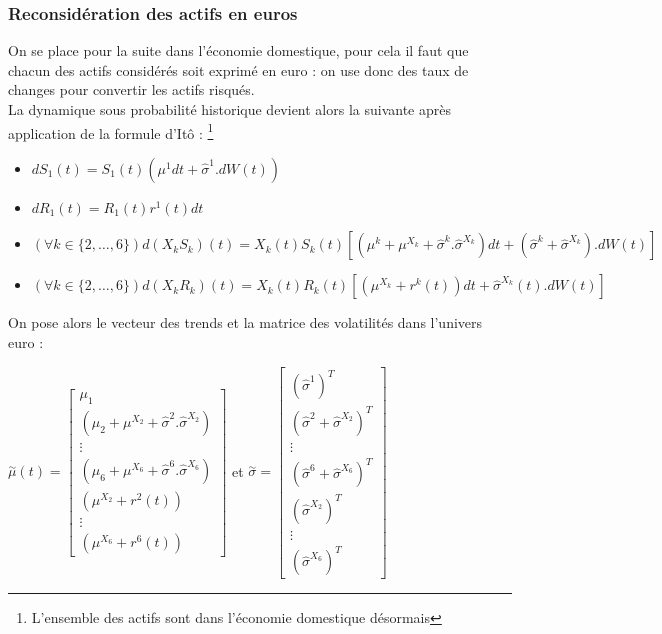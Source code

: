 \documentclass[a4paper,12pt]{article}
\begin{document}
\subsubsection{Reconsidération des actifs en euros}
On se place pour la suite dans l'économie domestique, pour cela il faut que chacun des actifs considérés soit exprimé en euro : on use donc des taux de changes pour convertir les actifs risqués. \\
La dynamique sous probabilité historique devient alors la suivante après application de la formule d'Itô :  \footnote{L'ensemble des actifs sont dans l'économie domestique désormais} 
\begin{itemize}[label=$\star$]
\item  $dS_1(t)=S_1(t)\left(\mu^1dt+\widehat{\sigma}^1.dW(t)\right)$ \\
\item $dR_1(t) = R_1(t)r^1(t)dt$ \\
\item $\left(\forall k \in \{2,\ldots,6\}\right)d(X_kS_k)(t)=X_k(t)S_k(t)\left[\left(\mu^k + \mu^{X_k} + \widehat{\sigma}^k.\widehat{\sigma}^{X_k}\right)dt+\left(\widehat{\sigma}^k+\widehat{\sigma}^{X_k}\right).dW(t)\right]$ \\
\item  $\left(\forall k \in \{2,\ldots,6\}\right)d(X_kR_k)(t)=X_k(t)R_k(t)\left[\left(\mu^{X_k}+r^k(t)\right)dt+\widehat{\sigma}^{X_k}(t).dW(t)\right]$
\end{itemize} \vspace*{2mm} 
On pose alors le vecteur des trends et la matrice des volatilités dans l'univers euro : \begin{center} $\overset{\sim}{\mu}(t) = 
\begin{bmatrix}
\mu_1 \\
\left(\mu_2+\mu^{X_2}+\widehat{\sigma}^2.\widehat{\sigma}^{X_2}\right) \\
\vdots \\
\left(\mu_6+\mu^{X_6}+\widehat{\sigma}^6.\widehat{\sigma}^{X_6}\right) \\
\left(\mu^{X_2}+r^2(t)\right) \\
\vdots \\
\left(\mu^{X_6}+r^6(t)\right)
\end{bmatrix}$
 et $\overset{\sim}{\sigma} = 
\begin{bmatrix}
\left(\widehat{\sigma}^1\right)^T \\
\left(\widehat{\sigma}^2+\widehat{\sigma}^{X_2}\right)^T \\
\vdots \\
\left(\widehat{\sigma}^6+\widehat{\sigma}^{X_6}\right)^T \\
\left(\widehat{\sigma}^{X_2}\right)^T \\
\vdots \\
\left(\widehat{\sigma}^{X_6}\right)^T
\end{bmatrix}
$ 
\end{center}
\end{document}

